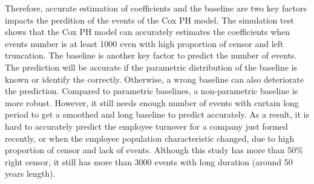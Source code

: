 \documentclass[12pt,letterpaper]{article}
\begin{document}
Therefore, accurate estimation of coefficients and the baseline are two key factors impacts the perdition of the events of the Cox PH model. The simulation test shows that the Cox PH model can accurately estimates the coefficients when events number is at least 1000 even with high proportion of censor and left truncation. The baseline is another key factor to predict the number of events. The prediction will be accurate if the parametric distribution of the baseline is known or identify the correctly. Otherwise, a wrong baseline can also deteriorate the prediction. Compared to parametric baselines, a non-parametric baseline is more robust. However, it still needs enough number of events with curtain long period to get a smoothed and long baseline to predict accurately. As a result, it is hard to accurately predict the employee turnover for a company just formed recently, or when the employee population characteristic changed, due to high proportion of censor and lack of events. Although this study has more than 50\% right censor, it still has more than 3000 events with long duration (around 50 years length).



\end{document}
